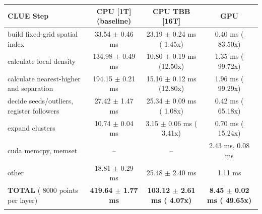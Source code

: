     \begin{tabular}{l|c|c|c}
    \hline
    CLUE Step                                 & CPU [1T] (baseline)         & CPU TBB [16T]                         & GPU                       \\ \hline
    build fixed-grid spatial index            &  33.54 $\pm$  0.46 ms       &  23.19 $\pm$  0.24 ms ( 1.45x)        &   0.40 ms ( 83.50x)       \\
    calculate local density                   & 134.98 $\pm$  0.49 ms       &  10.80 $\pm$  0.19 ms (12.50x)        &   1.35 ms ( 99.72x)       \\
    calculate nearest-higher and separation   & 194.15 $\pm$  0.21 ms       &  15.16 $\pm$  0.12 ms (12.80x)        &   1.96 ms ( 99.29x)       \\
    decide seeds/outliers, register followers &  27.42 $\pm$  1.47 ms       &  25.34 $\pm$  0.09 ms ( 1.08x)        &   0.42 ms ( 65.18x)       \\
    expand clusters                           &  10.74 $\pm$  0.04 ms       &   3.15 $\pm$  0.06 ms ( 3.41x)        &   0.70 ms ( 15.24x)       \\ \hline
    cuda memcpy, memset                       & --                          & --                                    &   2.43 ms,   0.08 ms      \\
    other                                     &  18.81 $\pm$  0.29 ms       &  25.48 $\pm$  2.40 ms                 &   1.11 ms                 \\ \hline
    \textbf{TOTAL} ( 8000 points per layer)   & \textbf{419.64 $\pm$  1.77 ms} & \textbf{103.12 $\pm$  2.61 ms ( 4.07x)} & \textbf{  8.45 $\pm$  0.02 ms ( 49.65x)}  \\
    \hline
    \multicolumn{4}{c}{}
    \end{tabular}
    \linebreak


